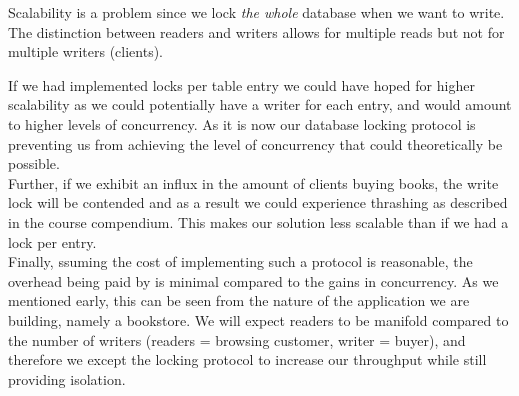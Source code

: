\documentclass[11pt]{article}
\begin{document}

Scalability is a problem since we lock \emph{the whole} database when we
want to write. The distinction between readers and writers
allows for multiple reads but not for multiple writers (clients).

If we had implemented locks per table entry we could have
hoped for higher scalability as we could potentially have a writer for each
entry, and would amount to higher levels of concurrency. As it is now
our database locking protocol is preventing us from achieving
the level of concurrency that could theoretically be possible.\\

Further, if we exhibit an influx in the amount of clients buying books,
the write lock will be contended and as a result we could experience
thrashing as described in the course compendium. This makes our
solution less scalable than if we had a lock per entry.\\

Finally, ssuming the cost of implementing such a protocol is reasonable, the
overhead being paid by is minimal compared to the gains in concurrency.
As we mentioned early, this can be seen from the nature of the application
we are building, namely a bookstore. We will expect readers to be manifold
compared to the number of writers (readers = browsing customer, writer = 
buyer), and therefore we except the locking protocol to increase our 
throughput while still providing isolation.
\end{document}
